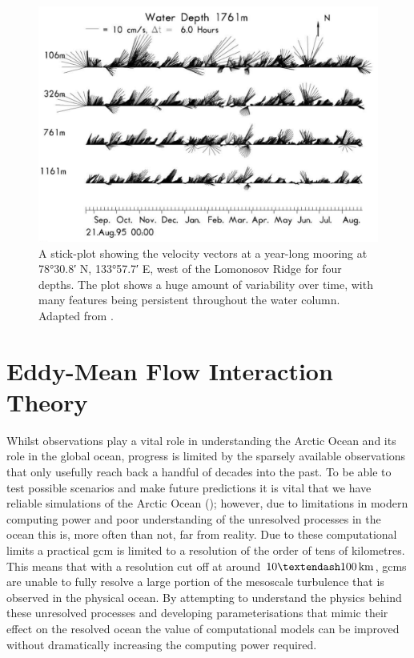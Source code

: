 \documentclass[12pt,a4paper]{report}
\begin{document}
\begin{figure}
	\centering
	\includegraphics[width=\linewidth]{Woodgate2001Mooring}
	\caption[Adapted from \cite{woodgate2001arctic}]{A  stick-plot showing the velocity vectors at 
		a year-long mooring at \ang{78;30.8;} N, \ang{133;57.7;} E, west of the Lomonosov Ridge for four depths.  The plot shows a huge amount of variability over time, with many
		features being persistent throughout the water column. Adapted from \cite{woodgate2001arctic}.}
	\label{fig:Woodgate2001Mooring}
\end{figure}

\section{Eddy-Mean Flow Interaction Theory}

\label{meaneddyinteractiontheory}

 Whilst observations play a vital role in understanding the Arctic
 Ocean and its role in the global ocean, progress is limited by the sparsely available
 observations that only usefully reach back a handful of decades into the past.
 To be able to test possible scenarios and make future predictions it is vital
 that we have reliable simulations of the Arctic Ocean (\cite{proshutinsky2008toward});
 however, due to limitations
 in modern computing power and poor understanding of the unresolved processes 
 in the ocean this is, more often than not, far from reality.
 Due to these computational limits a practical \gls{gcm} is 
 limited to a  resolution of the order of tens of kilometres. This means that with a 
 resolution  cut off at around $10 \textendash 100 \, \mathrm{km}$, 
 \glspl{gcm} are unable to fully resolve a large portion of the mesoscale turbulence that is
 observed in the physical ocean.
 By attempting  to understand the physics behind these unresolved processes 
 and developing parameterisations that mimic their effect on the resolved ocean
 the value of computational models can be improved without dramatically increasing the
 computing power required.  
 
\end{document}
